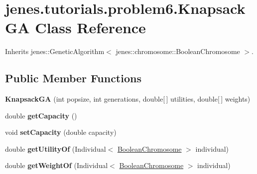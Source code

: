 \hypertarget{classjenes_1_1tutorials_1_1problem6_1_1_knapsack_g_a}{
\section{jenes.tutorials.problem6.KnapsackGA Class Reference}
\label{classjenes_1_1tutorials_1_1problem6_1_1_knapsack_g_a}
}
Inherits jenes::GeneticAlgorithm$<$ jenes::chromosome::BooleanChromosome $>$.

\subsection*{Public Member Functions}
\begin{CompactItemize}
\item 
\hypertarget{classjenes_1_1tutorials_1_1problem6_1_1_knapsack_g_a_a9c826f237b43aa1cd061664c2f81f42}{
\textbf{KnapsackGA} (int popsize, int generations, double\mbox{[}$\,$\mbox{]} utilities, double\mbox{[}$\,$\mbox{]} weights)}
\label{classjenes_1_1tutorials_1_1problem6_1_1_knapsack_g_a_a9c826f237b43aa1cd061664c2f81f42}

\item 
\hypertarget{classjenes_1_1tutorials_1_1problem6_1_1_knapsack_g_a_a8e92fd2de8e1168d812074c0ebd19d1}{
double \textbf{getCapacity} ()}
\label{classjenes_1_1tutorials_1_1problem6_1_1_knapsack_g_a_a8e92fd2de8e1168d812074c0ebd19d1}

\item 
\hypertarget{classjenes_1_1tutorials_1_1problem6_1_1_knapsack_g_a_6fd3b4ce9620189f4ef916a3616d7868}{
void \textbf{setCapacity} (double capacity)}
\label{classjenes_1_1tutorials_1_1problem6_1_1_knapsack_g_a_6fd3b4ce9620189f4ef916a3616d7868}

\item 
\hypertarget{classjenes_1_1tutorials_1_1problem6_1_1_knapsack_g_a_77be24cd9e25a9306562826f56113641}{
double \textbf{getUtilityOf} (Individual$<$ \hyperlink{classjenes_1_1chromosome_1_1_boolean_chromosome}{BooleanChromosome} $>$ individual)}
\label{classjenes_1_1tutorials_1_1problem6_1_1_knapsack_g_a_77be24cd9e25a9306562826f56113641}

\item 
\hypertarget{classjenes_1_1tutorials_1_1problem6_1_1_knapsack_g_a_b3cf2a428b860020788cfbe381ed195f}{
double \textbf{getWeightOf} (Individual$<$ \hyperlink{classjenes_1_1chromosome_1_1_boolean_chromosome}{BooleanChromosome} $>$ individual)}
\label{classjenes_1_1tutorials_1_1problem6_1_1_knapsack_g_a_b3cf2a428b860020788cfbe381ed195f}

\end{CompactItemize}
